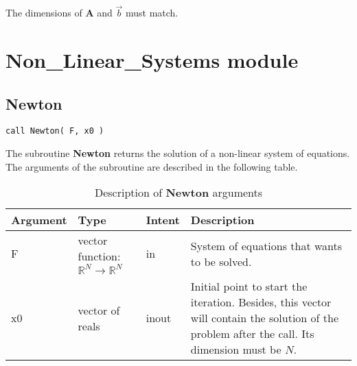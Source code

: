 The dimensions of $\textbf{A}$ and $\vec{b}$ must match.

\section{Non\_Linear\_Systems module}

\subsection*{Newton}

\lstset{language=Fortran}
\begin{lstlisting}[frame=trBL]
call Newton( F, x0 )
\end{lstlisting}

The subroutine \textbf{Newton} returns the solution of a non-linear system of equations. The arguments of the subroutine are described in the following table.

\begin{table}[H]
	\begin{center}
	\begin{spacing}{1.2}
		\begin{tabular}{| l | l | l | p{7cm} |}
			
			\hline
			
			\bf Argument & \bf Type & \bf Intent & \bf Description \\ \hline \hline
			
			F & vector function: $\mathbb{R}^{N} \rightarrow \mathbb{R}^{N}$ & in & System of equations that wants to be solved. \\ \hline
			
			x0 & vector of reals & inout & Initial point to start the iteration. Besides, this vector will contain the solution of the problem after the call. Its dimension must be $N$. \\ \hline
			
		\end{tabular}		
	\end{spacing}
	\end{center}
	\caption{Description of \textbf{Newton} arguments}
\end{table}